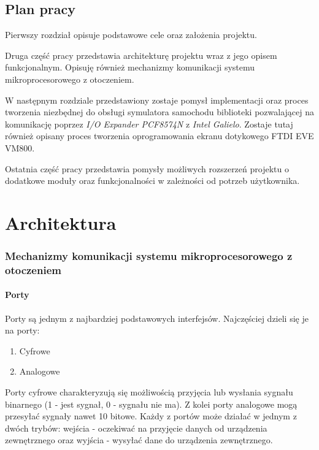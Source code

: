 \documentclass{xmgr}
\begin{document}
\section{Plan pracy}

Pierwszy rozdział opisuje podstawowe cele oraz założenia projektu.

Druga część pracy przedstawia architekturę projektu wraz z jego opisem funkcjonalnym. Opisuję również mechanizmy komunikacji systemu mikroprocesorowego z otoczeniem.

W następnym rozdziale przedstawiony zostaje pomysł implementacji oraz proces tworzenia niezbędnej do obsługi symulatora samochodu biblioteki pozwalającej na komunikację poprzez \emph{I/O Expander PCF8574N} z \emph{Intel Galielo}. Zostaje tutaj również opisany proces tworzenia oprogramowania ekranu dotykowego FTDI EVE VM800.

Ostatnia część pracy przedstawia pomysły  możliwych rozszerzeń projektu o dodatkowe moduły oraz funkcjonalności w zależności od potrzeb użytkownika.

\chapter{Architektura}
\subsection{Mechanizmy komunikacji systemu mikroprocesorowego z otoczeniem}
\subsubsection{Porty}

Porty są jednym z najbardziej podstawowych interfejsów. Najczęściej dzieli się je na porty:
\begin{enumerate}
	\item Cyfrowe
	\item Analogowe
\end{enumerate}

Porty cyfrowe charakteryzują się możliwością przyjęcia lub wysłania sygnału binarnego (1 - jest sygnał, 0 - sygnału nie ma). Z kolei porty analogowe mogą przesyłać sygnały nawet 10 bitowe. Każdy z portów może działać w jednym  z dwóch trybów: wejścia - oczekiwać na przyjęcie danych od urządzenia zewnętrznego oraz wyjścia - wysyłać dane do urządzenia zewnętrznego. 
\end{document}
